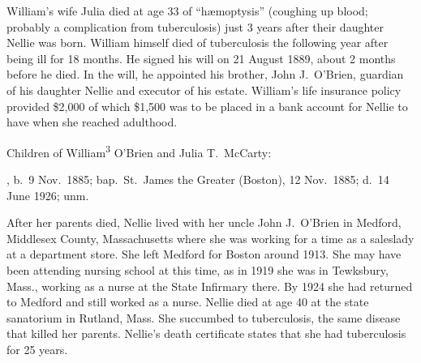 William's wife Julia died at age 33 of ``h\ae moptysis'' (coughing up blood; probably a complication from tuberculosis) just 3 years after their daughter Nellie was born.\cite{JuliaMcCartyDeath:2} William himself died of tuberculosis the following year after being ill for 18 months.\cite{William3OBrienDeath:2} He signed his will on 21 August 1889, about 2 months before he died. In the will, he appointed his brother, John J.\ O'Brien, guardian of his daughter Nellie and executor of his estate. William's life insurance policy provided \$2,000 of which \$1,500 was to be placed in a bank account for Nellie to have when she reached adulthood.\cite{WilliamOBrienWill}

\begin{KidsIntro}
	Children of William\textsuperscript{3} O'Brien and Julia T.\ McCarty:
\end{KidsIntro}

\begin{Kids}
	, b.\ 9 Nov.\ 1885;\cite{Ellen4OBrienBirth} bap.\ St.\ James the Greater (Boston), 12 Nov.\ 1885;\cite{Ellen4OBrienBaptism} d.\ 14 June 1926;\cite{Ellen4OBrienDeath:1} unm.
	
	\begin{KidsMoreText}
		After her parents died, Nellie lived with her uncle John J.\ O'Brien in Medford, Middlesex County, Massachusetts\cite{Census1900EllenOBrien} where she was working for a time as a saleslady at a department store.\cite{Census1910EllenOBrien} She left Medford for Boston around 1913.\cite{Ellen4OBrien1914} She may have been attending nursing school at this time, as in 1919 she was in Tewksbury, Mass., working as a nurse at the State Infirmary there.\cite{Ellen4OBrien1919,Census1920EllenOBrien} By 1924 she had returned to Medford and still worked as a nurse.\cite{Ellen4OBrien1924} Nellie died at age 40 at the state sanatorium in Rutland, Mass.\cite{Ellen4OBrienDeath:2,RutlandHospital} She succumbed to tuberculosis,\cite{Ellen4OBrienDeath2:1} the same disease that killed her parents. Nellie's death certificate states that she had tuberculosis for 25 years.\cite{Ellen4OBrienDeath2:2}
	\end{KidsMoreText}

\end{Kids}